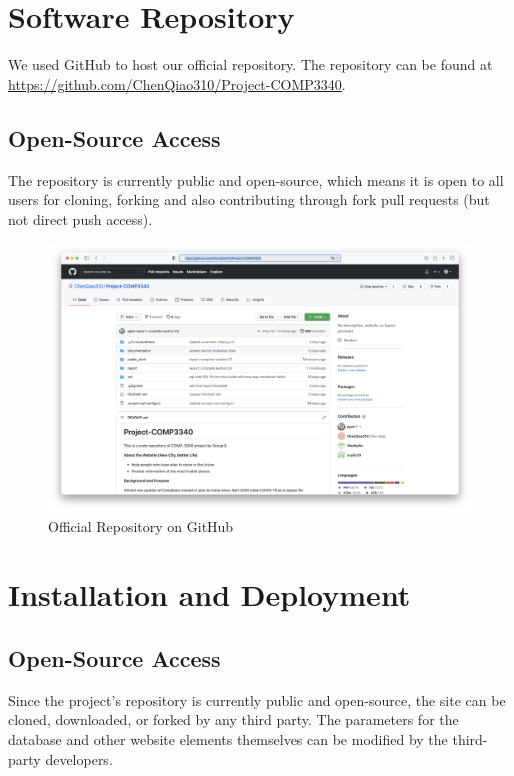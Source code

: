 \documentclass[12pt, letterpaper]{article}
\begin{document}
 \newpage

\section{Software Repository}
We used GitHub to host our official repository. The repository can be found at \url{https://github.com/ChenQiao310/Project-COMP3340}. 

\subsection*{Open-Source Access}
The repository is currently public and open-source, which means it is open to all users for cloning, forking and also contributing through fork pull requests (but not direct push access).

\begin{figure}[htbp]
	\centering
	\includegraphics[width=\textwidth]{images/24-repo.png}
	\caption{Official Repository on GitHub}
 \end{figure}

 \newpage

\section{Installation and Deployment}

\subsection*{Open-Source Access}
Since the project's repository is currently public and open-source, the site can be cloned, downloaded, or forked by any third party. The parameters for the database and other website elements themselves can be modified by the third-party developers.
\end{document}
